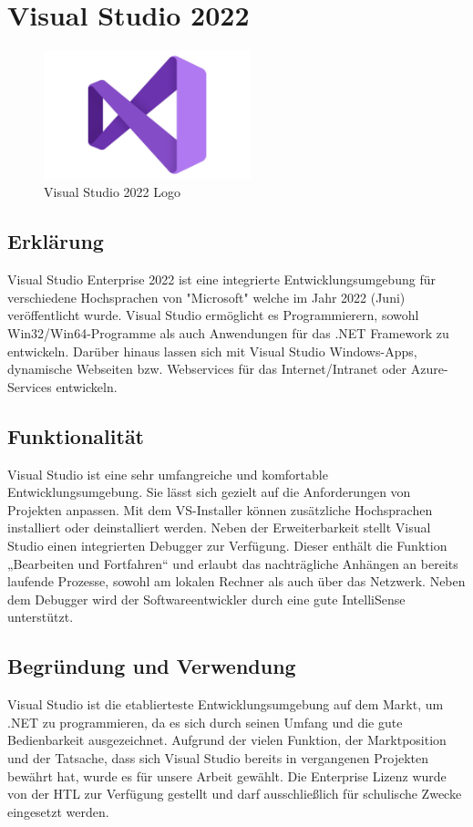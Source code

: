 \section{Visual Studio 2022}
\cite{VS2022}
\begin{figure}[h]
    \begin{center}
        \includegraphics*[width=6cm]{pics/Visual-Studio-Logo.png}
        \caption[VS 2022 Logo]{Visual Studio 2022 Logo \cite{VS2022logo}}
    \end{center}
\end{figure}
\subsection*{Erklärung}
Visual Studio Enterprise 2022 ist eine integrierte Entwicklungsumgebung für verschiedene 
Hochsprachen von "Microsoft" welche im Jahr 2022 (Juni) veröffentlicht wurde.
Visual Studio ermöglicht es Programmierern, sowohl Win32/Win64-Programme als
auch Anwendungen für das .NET Framework zu entwickeln. Darüber hinaus lassen sich
mit Visual Studio Windows-Apps, dynamische Webseiten bzw. Webservices für das
Internet/Intranet oder Azure-Services entwickeln.
\subsection*{Funktionalität}
Visual Studio ist eine sehr umfangreiche und komfortable Entwicklungsumgebung. Sie
lässt sich gezielt auf die Anforderungen von Projekten anpassen. Mit dem VS-Installer
können zusätzliche Hochsprachen installiert oder deinstalliert werden.
Neben der Erweiterbarkeit stellt Visual Studio einen integrierten Debugger zur Verfügung. Dieser enthält die Funktion „Bearbeiten und Fortfahren“ und erlaubt das
nachträgliche Anhängen an bereits laufende Prozesse, sowohl am lokalen Rechner als
auch über das Netzwerk. Neben dem Debugger wird der Softwareentwickler durch eine
gute IntelliSense unterstützt.
\subsection*{Begründung und Verwendung}
Visual Studio ist die etablierteste Entwicklungsumgebung auf dem Markt, um .NET
zu programmieren, da es sich durch seinen Umfang und die gute Bedienbarkeit ausgezeichnet. Aufgrund der vielen Funktion, der Marktposition und der Tatsache, dass
sich Visual Studio bereits in vergangenen Projekten bewährt hat, wurde es für unsere
Arbeit gewählt. Die Enterprise Lizenz wurde von der HTL zur Verfügung gestellt und
darf ausschließlich für schulische Zwecke eingesetzt werden.
\newpage

